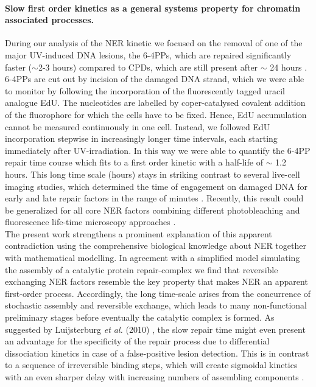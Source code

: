 \paragraph{Slow first order kinetics as a general systems property for chromatin associated processes.}
During our analysis of the NER kinetic we focused on the removal of one of the major UV-induced DNA lesions, the 6-4PPs, which are repaired significantly faster ($\sim$2-3 hours) compared to CPDs, which are still present after $\sim$ 24 hours \cite{Smerdon1978,vanHoffen:1995:EMBO-J:7835346,Luijsterburg2010}. 6-4PPs are cut out by incision of the damaged DNA strand, which we were able to monitor by following the incorporation of the fluorescently tagged uracil analogue EdU. The nucleotides are labelled by coper-catalysed covalent addition of the fluorophore for which the cells have to be fixed. Hence, EdU accumulation cannot be measured continuously in one cell. Instead, we followed EdU incorporation stepwise in increasingly longer time intervals, each starting immediately after UV-irradiation. In this way we were able to quantify the 6-4PP repair time course which fits to a first order kinetic with a half-life of $\sim$ 1.2 hours.         
This long time scale (hours) stays in striking contrast to several live-cell imaging studies, which determined the time of engagement on damaged DNA for early and late repair factors in the range of minutes \cite{Houtsmuller1999,Volker2001,Hoogstraten2002,Rademakers2003,Mone2004,Zotter2006,Hoogstraten2008}. Recently, this result could be generalized for all core NER factors combining different photobleaching and fluorescence life-time microscopy approaches \cite{Luijsterburg2010}.\\
The present work strengthens a prominent explanation of this apparent contradiction using the comprehensive biological knowledge about NER together with mathematical modelling. In agreement with a simplified model simulating the assembly of a catalytic protein repair-complex \cite{Terstiege2010} we find that reversible exchanging NER factors resemble the key property that makes NER an apparent first-order process. Accordingly, the long time-scale arises from the concurrence of stochastic assembly and reversible exchange, which leads to many non-functional preliminary stages before eventually the catalytic complex is formed. As suggested by Luijsterburg \textit{et al.} (2010) \cite{Luijsterburg2010}, the slow repair time might even present an advantage for the specificity of the repair process due to differential dissociation kinetics in case of a false-positive lesion detection. This is in contrast to a sequence of irreversible binding steps, which will create sigmoidal kinetics with an even sharper delay with increasing numbers of assembling components \cite{Terstiege2010}.\\ 
